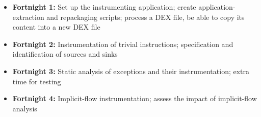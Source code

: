 \documentclass[12pt]{article}
\begin{document}
\begin{itemize}
	\item{\textbf{Fortnight 1:} Set up the instrumenting application; 
	      create application-extraction and repackaging scripts; process 
	      a DEX file, be able to copy its content into a new DEX file}
	\item{\textbf{Fortnight 2:} Instrumentation of trivial instructions;
	      specification and identification of sources and sinks}
	\item{\textbf{Fortnight 3:} Static analysis of exceptions and their 
	      instrumentation; extra time for testing}
	\item{\textbf{Fortnight 4:} Implicit-flow instrumentation; assess 
	      the impact of implicit-flow analysis}
\end{itemize}

\printbibliography
\end{document}
